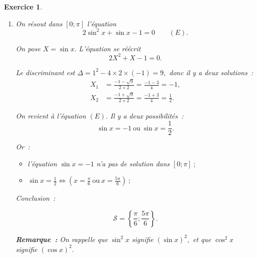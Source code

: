 \documentclass[10pt]{article}
\newtheorem{exo}{Exercice}
\begin{document}
\begin{exo}
\begin{enumerate}
\begin{multicols}{2}
\end{multicols}

\item \begin{multicols}{2} On résout dans $\left[0;\pi\right]$ l'équation \[2\sin^2 x+\sin x-1=0\qquad (E).\]

\medskip

On pose $X=\sin x.$ L'équation se réécrit
\[2X^2+X-1=0.\]

Le discriminant est $\Delta=1^2-4\times 2\times (-1)=9,$ donc il y a deux solutions~:
\begin{align*}
X_1&=\frac{-1-\sqrt{9}}{2\times 2}=\frac{-1-3}{4}=-1,
\\ X_2&=\frac{-1+\sqrt{9}}{2\times 2}=\frac{-1+3}{4}=\frac{1}{2}.
\end{align*}

\medskip

On revient à l'équation $(E).$ Il y a deux possibilités~:
\[\sin x=-1~\text{ou}~\sin x=\frac{1}{2}.\]

Or~:
\begin{itemize}
\item[\textbullet] l'équation $\sin x=-1$ n'a pas de solution dans $\left[0;\pi\right]~;$
\item[\textbullet] $\sin x=\frac{1}{2}\iff \left(x=\frac{\pi}{6}~\text{ou}~x=\frac{5\pi}{6}\right)~;$
\end{itemize}

\medskip

Conclusion~:

 \[\boxed{\mathcal{S}=\left\{\frac{\pi}{6};\frac{5\pi}{6}\right\}.}\]


\medskip

\textbf{Remarque~:} On rappelle que $\sin^2 x$ signifie $(\sin x)^2,$ et que $\cos^2 x$ signifie $(\cos x)^2.$


\end{multicols}
\end{enumerate}
\end{exo}
\end{document}
